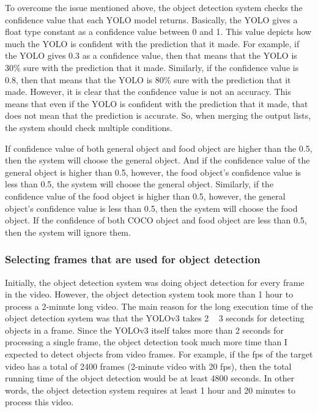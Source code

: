 \documentclass{article}
\begin{document}
To overcome the issue mentioned above, the object detection system checks the confidence value that each YOLO model returns. Basically, the YOLO gives a float type constant as a confidence value between 0 and 1. This value depicts how much the YOLO is confident with the prediction that it made. For example, if the YOLO gives 0.3 as a confidence value, then that means that the YOLO is 30\% sure with the prediction that it made. Similarly, if the confidence value is 0.8, then that means that the YOLO is 80\% sure with the prediction that it made. However, it is clear that the confidence value is not an accuracy. This means that even if the YOLO is confident with the prediction that it made, that does not mean that the prediction is accurate. So, when merging the output lists, the system should check multiple conditions.

If confidence value of both general object and food object are higher than the 0.5, then the system will choose the general object. And if the confidence value of the general object is higher than 0.5, however, the food object's confidence value is less than 0.5, the system will choose the general object. Similarly, if the confidence value of the food object is higher than 0.5, however, the general object's confidence value is less than 0.5, then the system will choose the food object. If the confidence of both COCO object and food object are less than 0.5, then the system will ignore them.

\subsubsection{Selecting frames that are used for object detection}

Initially, the object detection system was doing object detection for every frame in the video. However, the object detection system took more than 1 hour to process a 2-minute long video. The main reason for the long execution time of the object detection system was that the YOLOv3 takes 2 ~ 3 seconds for detecting objects in a frame. Since the YOLOv3 itself takes more than 2 seconds for processing a single frame, the object detection took much more time than I expected to detect objects from video frames. For example, if the fps of the target video has a total of 2400 frames (2-minute video with 20 fps), then the total running time of the object detection would be at least 4800 seconds. In other words, the object detection system requires at least 1 hour and 20 minutes to process this video.
\end{document}
